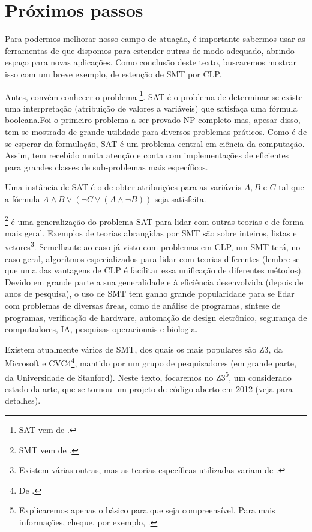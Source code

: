 \documentclass{article}
\begin{document}
\section{Próximos passos}

Para podermos melhorar nosso campo de atuação, é importante sabermos
usar as ferramentas de que dispomos para estender outras de modo
adequado, abrindo espaço para novas aplicações. Como conclusão deste
texto, buscaremos mostrar isso com um breve exemplo, de estenção de
 SMT por CLP.

Antes, convém conhecer o problema  \footnote{SAT
  vem de .}. SAT é o problema de
determinar se existe uma interpretação (atribuição de
valores  a variáveis) que
satisfaça uma fórmula booleana.Foi o primeiro
problema a ser provado NP-completo mas, apesar disso, tem se mostrado
de grande utilidade para diversos problemas práticos. Como é de se
esperar da formulação, SAT é um problema central em ciência da
computação. Assim, tem recebido muita atenção e conta com
implementações de  eficientes para grandes classes de
sub-problemas mais específicos.

Uma instância de SAT é o de obter atribuições para as variáveis $A, B$
e $C$ tal que a fórmula $A \wedge B \vee (\neg C \vee (A \wedge \neg B))$ seja satisfeita.

\footnote{SMT vem de
  .} é uma generalização do
problema SAT para lidar com outras teorias e de forma mais
geral. Exemplos de teorias abrangidas por SMT são sobre inteiros,
listas e vetores\footnote{Existem várias outras, mas as teorias
  específicas utilizadas variam de .}. Semelhante ao
caso já visto com problemas em CLP, um  SMT terá, no caso
geral, algorítmos especializados para lidar com teorias diferentes
(lembre-se que uma das vantagens de CLP é facilitar essa unificação de
diferentes métodos). Devido em grande parte a sua generalidade e
à eficiência desenvolvida (depois de anos de pesquisa), o uso de
 SMT tem ganho grande
popularidade para se lidar com problemas de diversas áreas, como de
análise de programas\cite{zheng}, síntese de programas\cite{beyene},
verificação de hardware\cite{kroenig}, automação de design
eletrônico\cite{kroenig}, segurança de computadores\cite{vanegue}, IA,
pesquisas operacionais\cite{li} e biologia\cite{yordanov}.

Existem atualmente vários  de SMT, dos quais os mais
populares são Z3, da Microsoft e CVC4\footnote{De
  .}, mantido por um grupo de
pesquisadores (em grande parte, da Universidade de Stanford). Neste
texto, focaremos no Z3\footnote{Explicaremos apenas o básico para que
  seja compreensível. Para mais informações, cheque, por exemplo,
  \cite{z3}.}, um  considerado
estado-da-arte, que se tornou um projeto de código aberto em 2012
(veja \cite{leo} para detalhes).
\end{document}
